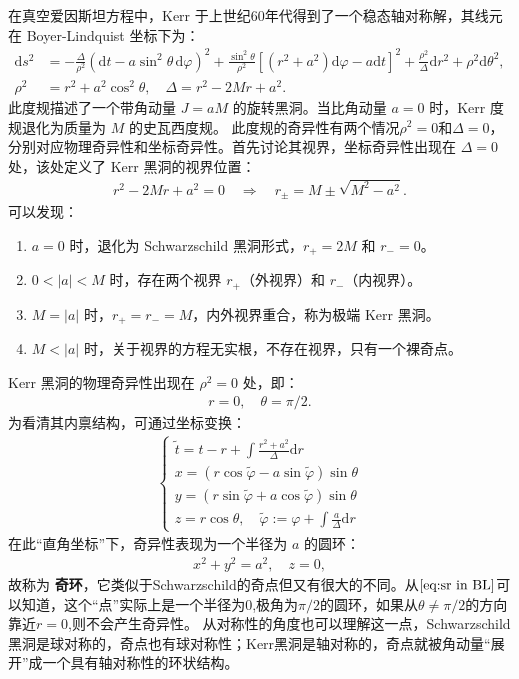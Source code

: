 在真空爱因斯坦方程中，Kerr 于上世纪60年代得到了一个稳态轴对称解，其线元在 Boyer-Lindquist 坐标下为：
\begin{align}
\mathrm{d}s^{2} &= -\frac{\Delta}{\rho^{2}}(\mathrm{d}t - a\sin^{2}\theta \, \mathrm{d}\varphi)^{2} + \frac{\sin^{2}\theta}{\rho^{2}}[(r^{2}+a^{2})\mathrm{d}\varphi - a\mathrm{d}t]^{2} + \frac{\rho^{2}}{\Delta}\mathrm{d}r^{2} + \rho^{2}\mathrm{d}\theta^{2}, \label{eq:kerr_metric} \\
\rho^{2} &= r^{2} + a^{2}\cos^{2}\theta, \quad \Delta = r^{2} - 2Mr + a^{2}.
\end{align}
此度规描述了一个带角动量 $J = aM$ 的旋转黑洞。当比角动量 $a=0$ 时，Kerr 度规退化为质量为 $M$ 的史瓦西度规。
此度规的奇异性有两个情况$\rho^2 = 0$和$\Delta = 0$，分别对应物理奇异性和坐标奇异性。首先讨论其视界，坐标奇异性出现在 $\Delta=0$ 处，该处定义了 Kerr 黑洞的视界位置：
\begin{align}
r^{2} - 2Mr + a^{2} = 0 \quad \Rightarrow \quad r_{\pm} = M \pm \sqrt{M^{2} - a^{2}} .
\end{align}
可以发现：
\begin{enumerate}[label=(\arabic*)]
    \item $a = 0$ 时，退化为 Schwarzschild 黑洞形式，$r_{+} = 2M$ 和 $r_{-}=0$。
    \item $0 < |a| < M$ 时，存在两个视界 $r_{+}$（外视界）和 $r_{-}$（内视界）。
    \item $M = |a|$ 时，$r_{+} = r_{-} = M$，内外视界重合，称为极端 Kerr 黑洞。
    \item $M < |a|$ 时，关于视界的方程无实根，不存在视界，只有一个裸奇点。
\end{enumerate}

Kerr 黑洞的物理奇异性出现在 $\rho^{2}=0$ 处，即：
\begin{align}
r=0,\quad \theta = \pi/2.
\label{eq:sr in BL}
\end{align}
为看清其内禀结构，可通过坐标变换：
\begin{align}
\left\{\begin{array}{c}
\tilde{t}=t-r+\displaystyle\int \frac{r^{2}+a^{2}}{\Delta} \mathrm{d}r \\
x=(r \cos \tilde{\varphi}-a \sin \tilde{\varphi}) \sin \theta \\
y=(r \sin \tilde{\varphi}+a \cos \tilde{\varphi}) \sin \theta \\
z=r \cos \theta, \quad \tilde{\varphi}:=\varphi+\displaystyle\int \frac{a}{\Delta} \mathrm{d}r
\end{array}\right.
\end{align}
在此“直角坐标”下，奇异性表现为一个半径为 $a$ 的圆环：
\begin{align}
x^{2}+y^{2}=a^{2},\quad z=0,
\end{align}
故称为 \textbf{奇环}，它类似于Schwarzschild的奇点但又有很大的不同。从$\ref{eq:sr in BL}$可以知道，这个“点”实际上是一个半径为0,极角为$\pi/2$的圆环，如果从$\theta \neq \pi/2$的方向靠近$r=0$,则不会产生奇异性。
从对称性的角度也可以理解这一点，Schwarzschild黑洞是球对称的，奇点也有球对称性；Kerr黑洞是轴对称的，奇点就被角动量“展开”成一个具有轴对称性的环状结构。

